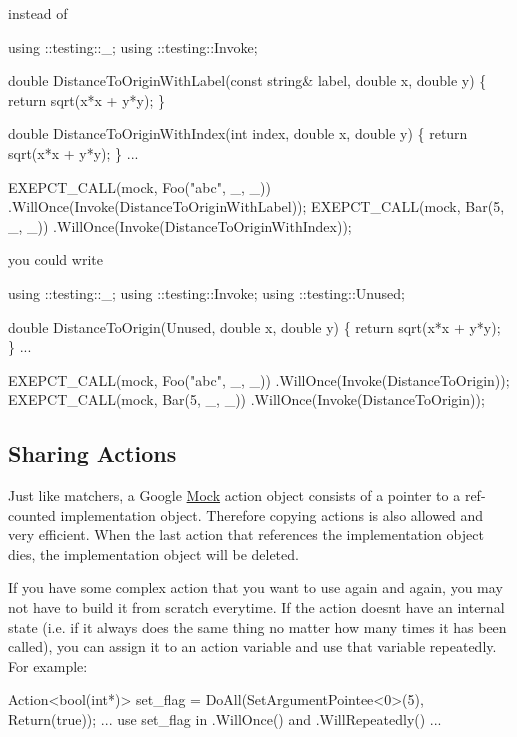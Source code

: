 instead of


\begin{DoxyCode}
using ::testing::\_;
using ::testing::Invoke;

double DistanceToOriginWithLabel(const string& label, double x, double y) \{
  return sqrt(x*x + y*y);
\}

double DistanceToOriginWithIndex(int index, double x, double y) \{
  return sqrt(x*x + y*y);
\}
...

  EXEPCT\_CALL(mock, Foo("abc", \_, \_))
      .WillOnce(Invoke(DistanceToOriginWithLabel));
  EXEPCT\_CALL(mock, Bar(5, \_, \_))
      .WillOnce(Invoke(DistanceToOriginWithIndex));
\end{DoxyCode}


you could write


\begin{DoxyCode}
using ::testing::\_;
using ::testing::Invoke;
using ::testing::Unused;

double DistanceToOrigin(Unused, double x, double y) \{
  return sqrt(x*x + y*y);
\}
...

  EXEPCT\_CALL(mock, Foo("abc", \_, \_))
      .WillOnce(Invoke(DistanceToOrigin));
  EXEPCT\_CALL(mock, Bar(5, \_, \_))
      .WillOnce(Invoke(DistanceToOrigin));
\end{DoxyCode}


\subsection*{Sharing Actions}

Just like matchers, a Google \hyperlink{class_mock}{Mock} action object consists of a pointer to a ref-\/counted implementation object. Therefore copying actions is also allowed and very efficient. When the last action that references the implementation object dies, the implementation object will be deleted.

If you have some complex action that you want to use again and again, you may not have to build it from scratch everytime. If the action doesn\textquotesingle{}t have an internal state (i.\+e. if it always does the same thing no matter how many times it has been called), you can assign it to an action variable and use that variable repeatedly. For example\+:


\begin{DoxyCode}
Action<bool(int*)> set\_flag = DoAll(SetArgumentPointee<0>(5),
                                    Return(true));
... use set\_flag in .WillOnce() and .WillRepeatedly() ...
\end{DoxyCode}


